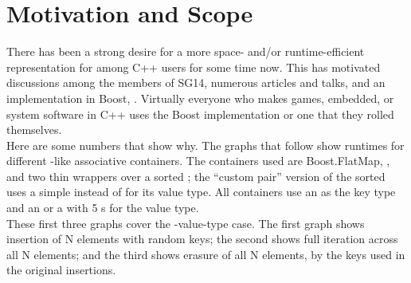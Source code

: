 \section{Motivation and Scope}

There has been a strong desire for a more space- and/or runtime-efficient
representation for  among C++ users for some time now.  This has
motivated discussions among the members of SG14, numerous articles and talks,
and an implementation in Boost, .  Virtually
everyone who makes games, embedded, or system software in C++ uses the Boost
implementation or one that they rolled themselves.\\

Here are some numbers that show why.  The graphs that follow show runtimes for
different -like associative containers.  The containers used are
Boost.FlatMap, , and two thin wrappers over a sorted
; the ``custom pair'' version of the sorted
 uses a simple  instead of  for
its value type.  All containers use an  as the key type and an
 or a  with 5 s for the value type.\\

These first three graphs cover the -value-type case.  The first
graph shows insertion of N elements with random keys; the second shows full
iteration across all N elements; and the third shows erasure of all N
elements, by the keys used in the original insertions.

\begin{center}
\end{center}

